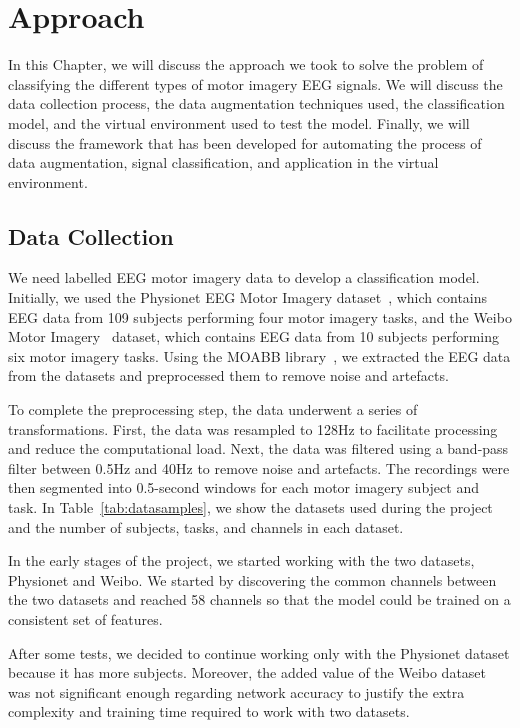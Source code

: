 \chapter{Approach}\label{ch:approach}
In this Chapter, we will discuss the approach we took to solve the problem of classifying the different types of motor imagery EEG signals.
We will discuss the data collection process, the data augmentation techniques used, the classification model, and the virtual environment used to test the model. 
Finally, we will discuss the framework that has been developed for automating the process of data augmentation, signal classification, and application in the virtual environment.

\section{Data Collection}
We need labelled EEG motor imagery data to develop a classification model.
Initially, we used the Physionet EEG Motor Imagery dataset~\cite{goldberger2000physiobank}, which contains EEG data from 109 subjects performing four motor imagery tasks, and the Weibo Motor Imagery~\cite{yi2014evaluation} dataset, which contains EEG data from 10 subjects performing six motor imagery tasks.
Using the MOABB library~\cite{Aristimunha_Mother_of_all_2023, chevallier2024largest, jayaram2018moabb}, we extracted the EEG data from the datasets and preprocessed them to remove noise and artefacts.

To complete the preprocessing step, the data underwent a series of transformations.
First, the data was resampled to 128Hz to facilitate processing and reduce the computational load.
Next, the data was filtered using a band-pass filter between 0.5Hz and 40Hz to remove noise and artefacts.
The recordings were then segmented into 0.5-second windows for each motor imagery subject and task.
In Table~\ref{tab:datasamples}, we show the datasets used during the project and the number of subjects, tasks, and channels in each dataset.

In the early stages of the project, we started working with the two datasets, Physionet and Weibo. We started by discovering the common channels between the two datasets and reached 58 channels so that the model could be trained on a consistent set of features.

After some tests, we decided to continue working only with the Physionet dataset because it has more subjects.
Moreover, the added value of the Weibo dataset was not significant enough regarding network accuracy to justify the extra complexity and training time required to work with two datasets.

